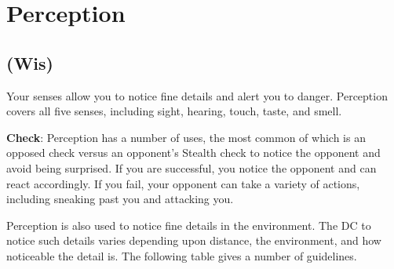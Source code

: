 \section{Perception}

\label{f0}
\subsection{(Wis)}

				
Your senses allow you to notice fine details and alert you to danger. Perception covers all five senses, including sight, hearing, touch, taste, and smell.
				
\textbf{Check}: Perception has a number of uses, the most common of which is an opposed check versus an opponent's Stealth check to notice the opponent and avoid being surprised. If you are successful, you notice the opponent and can react accordingly. If you fail, your opponent can take a variety of actions, including sneaking past you and attacking you.
				
Perception is also used to notice fine details in the environment. The DC to notice such details varies depending upon distance, the environment, and how noticeable the detail is. The following table gives a number of guidelines.

